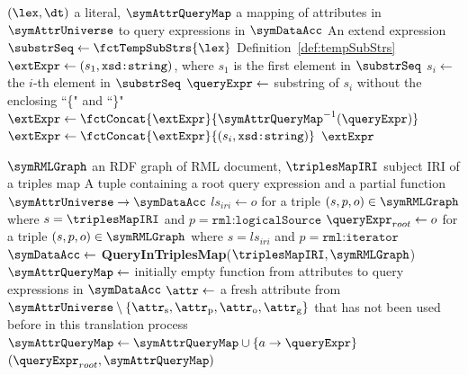 \begin{algorithm}[htbp]
	\caption{Template: An algorithm which extracts an extend expression for 
        resolving the template string of the input literal node.}
	\label{alg:template_function}
	\begin{algorithmic}[1]
        \Require $(\lex, \dt)$ a literal, 
        \Statex \qquad $\symAttrQueryMap$ a mapping of attributes in $\symAttrUniverse$ to query expressions in $\symDataAcc$
		\Ensure An extend expression
        \State $\substrSeq \gets \fctTempSubStrs{\lex}$ \Comment Definition~\ref{def:tempSubStrs}
        \State $\extExpr \gets (s_1, \texttt{xsd:string})$, where $s_1$ is the first element in $\substrSeq$
                \State $s_i \gets $
                    the $i$-th element in $\substrSeq$
                    \State $\queryExpr \gets $ substring of $s_i$ without the enclosing ``\{" and ``\}"
                    \State $\extExpr \gets \fctConcat{\extExpr}{\symAttrQueryMap^{-1}(\queryExpr)}$ 
                \Else
                    \State $\extExpr \gets \fctConcat{\extExpr}{(s_i, \texttt{xsd:string})}$   
                \EndIf
		    \EndFor
        \EndIf
		\State \Return $\extExpr$
	\end{algorithmic}
\end{algorithm}


\begin{algorithm}[htbp]
	\caption{TranslateSourceOperator: Source operator translation for a given triples map IRI $\triplesMapIRI$}
	\label{alg:rml_source_op}
	\begin{algorithmic}[1]
		\Require $\symRMLGraph$ an RDF graph of RML document,
		\Statex \qquad $\triplesMapIRI$ subject IRI of a triples map 
		\Ensure A tuple containing a root query expression and a partial function $\symAttrUniverse  \rightarrow  \symDataAcc$
		\State $ls_{iri} \gets o$ for a triple $(s,p,o) \in \symRMLGraph$ where $s = \triplesMapIRI$  and $p= \texttt{rml:logicalSource}$
		\State $\queryExpr_{root} \gets o$ for a triple $(s,p,o) \in \symRMLGraph$ where $s = ls_{iri}$  and $p=  \texttt{rml:iterator }$
		\State $\symDataAcc \gets$ \textbf{QueryInTriplesMap}($\triplesMapIRI, \symRMLGraph$) 
		\State $\symAttrQueryMap \gets$ initially empty function from attributes to query expressions in $\symDataAcc$
		\For{$\queryExpr \in \symDataAcc$}
		\State $\attr \gets$ a fresh attribute from $\symAttrUniverse \setminus \{ \attr_\textrm{s}, \attr_\textrm{p}, \attr_\textrm{o}, \attr_\textrm{g} \}$ that has not been used before in this translation process
		\State $\symAttrQueryMap \gets \symAttrQueryMap \cup \{ a \rightarrow \queryExpr \}$
		\EndFor
		\State \Return  $(\queryExpr_{root}, \symAttrQueryMap)$
	\end{algorithmic}
\end{algorithm}


